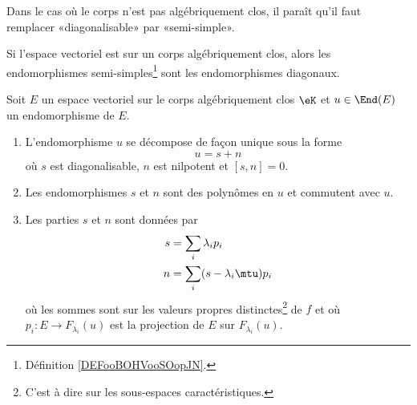 \begin{probleme}
    Dans le cas où le corps n'est pas algébriquement clos, il paraît qu'il faut remplacer «diagonalisable» par «semi-simple».
\end{probleme}

Si l'espace vectoriel est sur un corps algébriquement clos, alors les endomorphismes semi-simples\footnote{Définition \ref{DEFooBOHVooSOopJN}.} sont les endomorphismes diagonaux.


\begin{theorem} \label{ThoRURcpW}
    Soit \( E\) un espace vectoriel sur le corps algébriquement clos \( \eK\) et \( u\in\End(E)\) un endomorphisme de \( E\). 
    
    \begin{enumerate}
        \item
            
            L'endomorphisme \( u\) se décompose de façon unique sous la forme
            \begin{equation}
                u=s+n
            \end{equation}
            où \( s\) est diagonalisable, \( n\) est nilpotent et \( [s,n]=0\).
        \item
            Les endomorphismes \( s\) et \( n\) sont des polynômes en \( u\) et commutent avec \( u\).
        \item   \label{ItemThoRURcpWiii}
            Les parties \( s\) et \( n\) sont données par
            \begin{subequations}
                \begin{align}
                    s&=\sum_i\lambda_ip_i\\
                    n&=\sum_i(s-\lambda_i\mtu)p_i
                \end{align}
            \end{subequations}
            où les sommes sont sur les valeurs propres distinctes\footnote{C'est à dire sur les sous-espaces caractéristiques.} de \( f\) et où \( p_i\colon E\to F_{\lambda_i}(u)\) est la projection de \( E\) sur \( F_{\lambda_i}(u)\).
    \end{enumerate}
\end{theorem}

